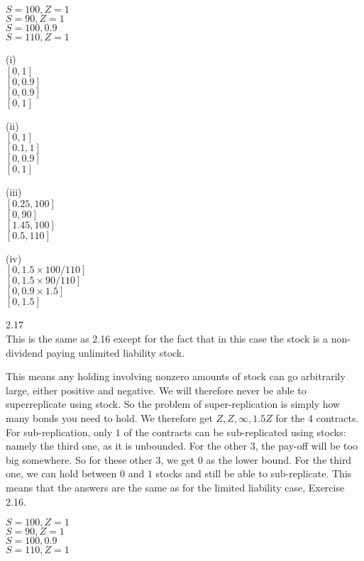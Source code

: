 $S=100,Z=1$ \\
$S=90,Z=1$ \\
$S=100,0.9$ \\
$S=110,Z=1$

(i) \\
$\boxed{[0,1]}$ \\
$\boxed{[0,0.9]}$ \\
$\boxed{[0,0.9]}$ \\
$\boxed{[0,1]}$

(ii) \\
$\boxed{[0,1]}$ \\
$\boxed{[0.1,1]}$ \\
$\boxed{[0,0.9]}$ \\
$\boxed{[0,1]}$

(iii) \\
$\boxed{[0.25,100]}$ \\
$\boxed{[0,90]}$ \\
$\boxed{[1.45,100]}$ \\
$\boxed{[0.5,110]}$

(iv) \\
$\boxed{[0,1.5 \times 100/110]}$ \\
$\boxed{[0,1.5 \times 90/110]}$ \\
$\boxed{[0,0.9 \times 1.5]}$ \\
$\boxed{[0,1.5]}$

2.17 \\

This is the same as 2.16 except for the fact that in this case the stock is a non-dividend paying unlimited liability stock.

This means any holding involving nonzero amounts of stock can go arbitrarily large, either positive and negative. We will therefore never be able to superreplicate using stock. So the problem of super-replication is simply how many bonds you need to hold. We therefore get $Z,Z,\infty ,1.5 Z$ for the $4$ contracts. For sub-replication, only $1$ of the contracts can be sub-replicated using stocks: namely the third one, as it is unbounded. For the other $3$, the pay-off will be too big somewhere. So for these other $3$, we get $0$ as the lower bound. For the third one, we can hold between $0$ and $1$ stocks and still be able to sub-replicate. This means that the answers are the same as for the limited liability case, Exercise 2.16.

$S=100,Z=1$ \\
$S=90,Z=1$ \\
$S=100,0.9$ \\
$S=110,Z=1$

